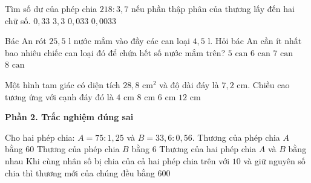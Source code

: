 \begin{ex} %
Tìm số dư của phép chia $218 : 3{,}7$ nếu phần thập phân của thương lấy đến hai chữ số.
\choice
{$0{,}33$}
{$3{,}3$}
{\True $0{,}033$}
{$0{,}0033$}
\end{ex}

\begin{ex} %
Bác An rót $25{,}5\text{ l}$ nước mắm vào đầy các can loại $4{,}5\text{ l}$. Hỏi bác An cần ít nhất bao nhiêu chiếc can loại đó để chứa hết số nước mắm trên?
\choice
{$5\text{ can}$}
{\True $6\text{ can}$}
{$7\text{ can}$}
{$8\text{ can}$}
\end{ex}

\begin{ex} %
Một hình tam giác có diện tích $28{,}8\text{ cm}^2$ và độ dài đáy là $7{,}2\text{ cm}$. Chiều cao tương ứng với cạnh đáy đó là
\choice
{$4\text{ cm}$}
{\True $8\text{ cm}$}
{$6\text{ cm}$}
{$12\text{ cm}$}
\end{ex}

\textbf{Phần 2. Trắc nghiệm đúng sai}

\begin{ex} %
Cho hai phép chia: $A = 75 : 1{,}25$ và $B = 33{,}6 : 0{,}56$.
\choiceTF
{\True Thương của phép chia $A$ bằng $60$}
{Thương của phép chia $B$ bằng $6$}
{\True Thương của hai phép chia $A$ và $B$ bằng nhau}
{\True Khi cùng nhân số bị chia của cả hai phép chia trên với $10$ và giữ nguyên số chia thì thương mới của chúng đều bằng $600$}
\end{ex}

